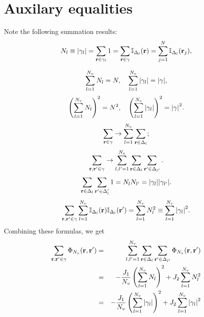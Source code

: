 \documentclass[12pt]{article}
\numberwithin{equation}{section}
\begin{document}
	\pagebreak
	
	\section{Auxilary equalities}
	Note the following summation results:
	\begin{equation}
		\label{eq:1}
		N_l \equiv \abs{\gamma_l} = \sum_{\vb{r} \in \gamma_l} 1 = \sum_{\vb{r} \in \gamma} \mathbb{I}_{\Delta_l}(\vb{r}) = \sum_{j=1}^{N} \mathbb{I}_{\Delta_{l}}(\vb{r}_j),
	\end{equation}
	
	\begin{equation}
		\label{eq:2}
		\sum_{l=1}^{N_v} N_l = N, \quad \sum_{l=1}^{N_v} \abs{\gamma_l} = \abs{\gamma},
	\end{equation}
	\begin{equation}
		\label{eq:3}
		\left(\sum_{l=1}^{N_v} N_l \right)^2 = N^2, \quad \left(\sum_{l=1}^{N_v} \abs{\gamma_l} \right)^2 = \abs{\gamma}^2.
	\end{equation}
	\begin{equation}
		\label{eq:4}
		\sum_{\vb{r} \in \gamma} \rightarrow \sum_{l=1}^{N_v} \sum_{\vb{r} \in \Delta_l};
	\end{equation}
	\begin{equation}
		\label{eq:5}
		\sum_{\vb{r}, \vb{r}' \in \gamma} \rightarrow \sum_{l,l'=1}^{N_v} \sum_{\vb{r} \in \Delta_l} \sum_{\vb{r}' \in \Delta_{l'}}.
	\end{equation}
	\begin{equation}
		\label{eq:6}
		\sum_{\vb{r} \in \Delta_l}\sum_{\vb{r}' \in \Delta_l'} 1 = N_l N_{l'} = \abs{\gamma_l} \abs{\gamma_{l'}}.
	\end{equation}
	\begin{equation}
		\label{eq:sumII}
		\sum_{\vb{r}, \vb{r}' \in \gamma}\sum_{l=1}^{N_v} \mathbb{I}_{\Delta_l}(\vb{r}) \mathbb{I}_{\Delta_{l}}(\vb{r}') = \sum_{l=1}^{N_v} N_l^2 \equiv \sum_{l=1}^{N_v} \abs{\gamma_l}^2.
	\end{equation}
	Combining these formulas, we get
	\begin{eqnarray}
		\sum_{\vb{r}, \vb{r}' \in \gamma} \Phi_{N_v}(\vb{r}, \vb{r}') & = & \sum_{l,l'=1}^{N_v} \sum_{\vb{r} \in \Delta_l} \sum_{\vb{r}' \in \Delta_{l'}} \Phi_{N_v}(\vb{r}, \vb{r}')
		\nonumber\\
		& = & - \frac{J_1}{N_v} \left(\sum_{l=1}^{N_v} N_l\right)^2 + J_2\sum_{l=1}^{N_v}N_l^2
		\\
		& = & - \frac{J_1}{N_v} \left(\sum_{l=1}^{N_v} \abs{\gamma_l}\right)^2 + J_2\sum_{l=1}^{N_v}\abs{\gamma_l}^2
	\end{eqnarray}
	
\end{document}
